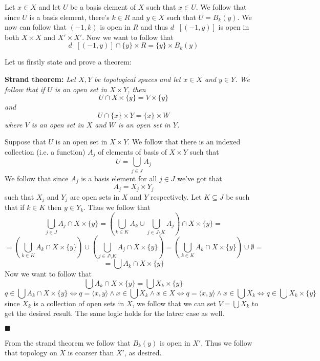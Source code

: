 \documentclass[11pt,oneside,titlepage]{book}
\DeclareMathOperator \inv {^{-1}}
\DeclareMathOperator \lra {\Leftrightarrow}
\newcommand{\eangle}[1]{\langle #1 \rangle}
\newcommand{\set}[1]{\{ #1 \}}
\newcommand{\qed}{\hfill $\blacksquare$}
\begin{document}
Let $x \in X$ and let $U$ be a basis element of $X$ such that $x \in U$.
We follow that since $U$ is a basis element, there's $k \in R$ and $y \in X$ such
that $U = B_k(y)$. We now can follow that $(-1, k)$ is open in $R$ and thus
$d\inv[(-1, y)]$ is open in both $X \times X$ and $X' \times X'$. Now we want to follow that
$$d\inv[(-1, y)] \cap \set{y} \times R = \set{y} \times B_k(y)$$

Let us firstly state and prove a theorem:

\textbf{Strand theorem: }
\textit{
  Let $X, Y$ be topological spaces and let $x \in X$ and $y \in Y$.
  We follow that if $U$ is an open set in $X \times Y$, then
  $$U \cap X \times \set{y} = V \times \set{y}$$
  and
  $$U \cap \set{x} \times Y = \set{x} \times W $$
  where $V$ is an open set in $X$ and $W$ is an open set in $Y$.
}

Suppose that $U$ is an open set in $X \times Y$. We follow that there is an indexed collection
(i.e. a function) $A_j$
of elements of basis of $X \times Y$ such that
$$U = \bigcup_{j \in J}{A_j}$$
We follow that since $A_j$ is a basis element for all $j \in J$ we've got that
$$A_j = X_j \times Y_j$$
such that $X_j$ and $Y_j$ are open sets in $X$ and $Y$ respectively. Let $K \subseteq J$
be such that if $k \in K$ then $y \in Y_k$. Thus we follow that
$$\bigcup_{j \in J}{A_j} \cap X \times \set{y} =
\left(\bigcup_{k \in K}{A_k} \cup \bigcup_{j \in J \setminus K}{A_j}\right)  \cap X \times \set{y} =
$$
$$ = 
\left(\bigcup_{k \in K}{A_k} \cap X \times \set{y}\right)  \cup
\left( \bigcup_{j \in J \setminus K}{A_j} \cap X \times \set{y} \right)=
 \left( \bigcup_{k \in K}{A_k} \cap X \times \set{y} \right) \cup \emptyset=$$
$$ = \bigcup{A_k} \cap X \times \set{y}
$$
Now we want to follow that
$$\bigcup{A_k} \cap X \times \set{y} = \bigcup{X_k} \times \set{y}$$
$$q \in \bigcup{A_k} \cap X \times \set{y} \lra q = \eangle{x, y} \land x \in \bigcup{X_k} \land
x \in X \lra
q = \eangle{x, y} \land x \in \bigcup{X_k} \lra q \in \bigcup{X_k} \times \set{y}$$
since $X_k$ is a collection of open sets in $X$, we follow that we can set $V = \bigcup{X_k}$
to get the desired result. The same logic holds for the latrer case as well.

\qed

From the strand theorem we follow that $B_k(y)$ is open in $X'$. Thus we follow that
topology on $X$ is coarser than $X'$, as desired.

\subsection{}
\end{document}
